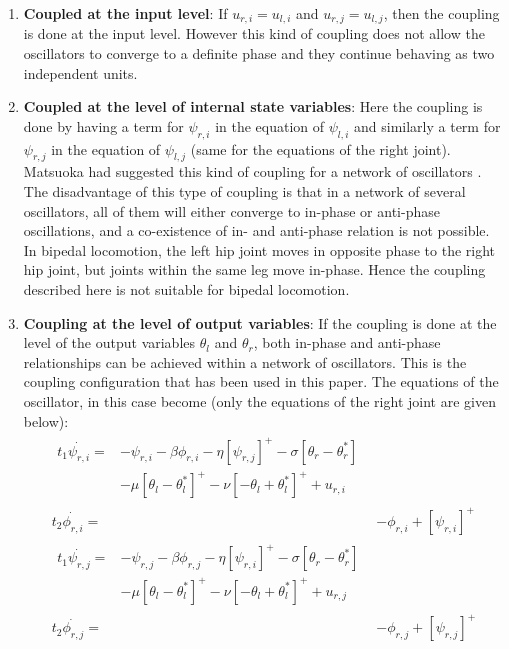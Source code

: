 \documentclass[12pt,twoside]{article}
\theoremstyle{plain}
\theoremstyle{definition}
\theoremstyle{remark}
\begin{document}
\begin{enumerate}
\item \textbf{Coupled at the input level}: If $u_{r,i}=u_{l,i}$ and $u_{r,j}=u_{l,j}$, then the coupling is done at the input level. However this kind of coupling does not allow the oscillators to converge to a definite phase and they continue behaving as two independent units.
\item \textbf{Coupled at the level of internal state variables}: Here the coupling is done by having a term for $\psi_{r,i}$ in the equation of $\psi_{l,i}$ and similarly a term for $\psi_{r,j}$ in the equation of $\psi_{l,j}$ (same for the equations of the right joint). Matsuoka had suggested this kind of coupling for a network of oscillators \cite{Matsuoka1987}. The disadvantage of this type of coupling is that in a network of several oscillators, all of them will either converge to in-phase or anti-phase oscillations, and a co-existence of in- and anti-phase relation is not possible. In bipedal locomotion, the left hip joint moves in opposite phase to the right hip joint, but joints within the same leg move in-phase. Hence the coupling described here is not suitable for bipedal locomotion.
\item \textbf{Coupling at the level of output variables}: If the coupling is done at the level of the output variables $\theta_l$ and $\theta_r$, both in-phase and anti-phase relationships can be achieved within a network of oscillators. This is the coupling configuration that has been used in this paper. The equations of the oscillator, in this case become (only the equations of the right joint are given below):\\

\begin{subequations}
\label{eq:matsuoka_coupled}
%
\begin{align}
\label{eq:matsuoka_coupled1}
\begin{split}
t_1 \dot{\psi_{r,i}}={}& -\psi_{r,i} - \beta \phi_{r,i} - \eta [\psi_{r,j}]^+ - \sigma [\theta_r - \theta^{*}_r]\\ 
& - \mu [\theta_l - \theta_l^*]^+ - \nu [-\theta_l + \theta_l^*]^+ + u_{r,i} 
\end{split}
\\
%
\label{eq:matsuoka_coupled2}
t_2 \dot{\phi_{r,i}} = {}& -\phi_{r,i} + [\psi_{r,i}]^+
\\
%
\label{eq:matsuoka_coupled3}
\begin{split}
t_1 \dot{\psi_{r,j}}={}& -\psi_{r,j} - \beta \phi_{r,j} - \eta [\psi_{r,i}]^+ - \sigma [\theta_r - \theta^{*}_r]\\
& - \mu [\theta_l - \theta_l^*]^+ - \nu [-\theta_l + \theta_l^*]^+ + u_{r,j}
\end{split}
\\
%
\label{eq:matsuoka_coupled4}
t_2 \dot{\phi_{r,j}} ={}& -\phi_{r,j} + [\psi_{r,j}]^+
\end{align}
%
\end{subequations}


\end{enumerate}
\end{document}
